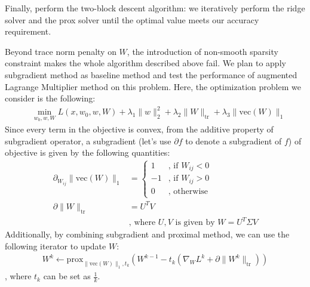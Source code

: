 \documentclass{article}
\newcommand{\tr}{\text{tr}}
\newcommand{\prox}{\text{prox}}
\newcommand{\vecc}{\text{vec}}
\begin{document}
Finally, perform the two-block descent algorithm: we iteratively perform the ridge solver and the prox solver until the optimal value meets our accuracy requirement.

Beyond trace norm penalty on $W$, the introduction of non-smooth sparsity constraint makes the whole algorithm described above fail. We plan to apply subgradient method as baseline method and test the performance of augmented Lagrange Multiplier method on this problem. Here, the optimization problem we consider is the following:
\begin{align}
  &\min_{w_0, w, W} L(x, w_0, w, W) + \lambda_1 \|w\|_2^2 + \lambda_2 \|W\|_{\tr} + \lambda_3 \|\vecc(W)\|_1 \label{eq:cfm}
\end{align}
Since every term in the objective is convex, from the additive property of subgradient operator, a subgradient (let’s use $\partial f$ to denote a subgradient of $f$) of objective is given by the following quantities:
\begin{align}
  \partial_{W_{ij}} \|\vecc(W)\|_1 &= \begin{cases}
    1 & \text{, if $W_{ij} < 0$} \nonumber \\
    -1 & \text{, if $W_{ij} > 0$} \nonumber \\
    0 & \text{, otherwise} 
\end{cases} \\
  \partial \|W\|_{\tr} &= U^TV \nonumber \\
  & \text{, where $U, V$ is given by $W = U^T \Sigma V$} \nonumber
\end{align}
Additionally, by combining subgradient and proximal method, we can use the following iterator to update $W$:
\begin{align*}
  W^k \leftarrow \prox_{\|\vecc(W)\|_1, t_k}(W^{k-1} -t_k (\nabla_W L^k + \partial \|W^k\|_{\tr}))
\end{align*}
, where $t_k$ can be set as $\frac{1}{k}$.
\end{document}
